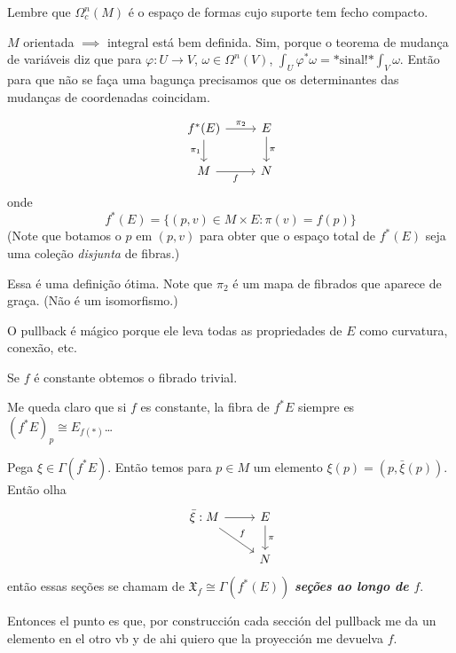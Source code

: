 Lembre que \(\Omega_c^n(M)\) é o espaço de formas cujo suporte tem fecho compacto.

\begin{remark}\leavevmode
\(M\) orientada \(\implies\) integral está bem definida. Sim, porque o teorema de mudança de variáveis diz que para \(\varphi: U \to V\), \(\omega \in \Omega^{n}(V)\), \(\int_U \varphi^*\omega=\text{*sinal!*}\int_V \omega \). Então para que não se faça uma bagunça precisamos que os determinantes das mudanças de coordenadas coincidam.
\end{remark}

\begin{defn}\leavevmode
\[\begin{tikzcd}
	f^* (E)\arrow[r,"\pi_2"]\arrow[d,"\pi_1",swap]&E\arrow[d,"\pi"]\\
	M\arrow[r,swap,"f"]&N
\end{tikzcd}\]
onde
\[f^*(E)=\{(p,v) \in M \times E: \pi(v)=f(p)\}\]
(Note que botamos o \(p\) em \((p,v)\) para obter que o espaço total de \(f^*(E)\) seja uma coleção \textit{disjunta} de fibras.)
\end{defn}
Essa é uma definição ótima. Note que \(\pi_2\) é um mapa de fibrados que aparece de graça. (Não é um isomorfismo.)

\begin{remark}\leavevmode
O pullback é mágico porque ele leva todas as propriedades de \(E\) como curvatura, conexão, etc.
\end{remark}

\begin{remark}\leavevmode
Se \(f\) é constante obtemos o fibrado trivial.
\end{remark}

\begin{question}\leavevmode
Me queda claro que si \(f\) es constante, la fibra de \(f^*E\) siempre es \((f^*E)_p \cong E_{f(*)}\)…
\end{question}

\begin{remark}\leavevmode
Pega  \(\xi \in\Gamma(f^* E)\). Então temos para \(p \in M\) um elemento \(\xi(p)=(p, \bar{\xi}(p)) \). Então olha
\[\begin{tikzcd}
	\bar{\xi} :M \arrow[r]\arrow[dr,"f"]&  E \arrow[d,"\pi"]\\& N
\end{tikzcd}\]
então essas seções se chamam de \(\mathfrak{X}_f \cong \Gamma(f^*(E))\) \textit{\textbf{seções ao longo de \(f\)}}.
\end{remark}
Entonces el punto es que, por construcción cada sección del pullback me da un elemento en el otro vb y de ahi quiero que la proyección me devuelva \(f\).

